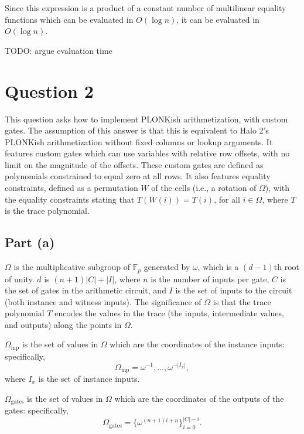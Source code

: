\documentclass[11pt]{article}
\begin{document}
Since this expression is a product of a constant number of multilinear equality functions which can be evaluated in
$O(\log n)$, it can be evaluated in $O(\log n)$.

TODO: argue evaluation time

\section{Question 2}

This question asks how to implement PLONKish arithmetization, with custom gates. The assumption of this
answer is that this is equivalent to Halo 2's PLONKish arithmetization without fixed columns or
lookup arguments. It features custom gates which can use variables with relative row offsets, with
no limit on the magnitude of the offsets. These custom gates are defined as polynomials constrained to equal
zero at all rows. It also features equality constraints, defined as a permutation $W$ of the cells (i.e.,
a rotation of $\Omega$), with the equality constraints stating that $T(W(i)) = T(i)$, for all $i \in \Omega$,
where $T$ is the trace polynomial.

\subsection{Part (a)}

$\Omega$ is the multiplicative subgroup of $\mathbb{F}_p$ generated by $\omega$, which is a $(d-1)$th root of unity.
$d$ is $(n+1)|C| + |I|$, where $n$ is the number of inputs per gate, $C$ is the set of gates in
the arithmetic circuit, and $I$ is the set of inputs
to the circuit (both instance and witness inputs). The significance of $\Omega$ is that the trace polynomial
$T$ encodes the values in the trace (the inputs, intermediate values, and outputs) along the points in $\Omega$.

$\Omega_{\text{inp}}$ is the set of values in $\Omega$ which are the coordinates of the instance inputs: specifically,
\begin{equation}
	\Omega_{\text{inp}} = \omega^{-1}, ..., \omega^{-|I_x|},
\end{equation}
where $I_x$ is the set of instance inputs.

$\Omega_{\text{gates}}$ is the set of values in $\Omega$ which are the coordinates of the outputs of the gates:
specifically,
\begin{equation}
	\Omega_{\text{gates}} = \{\omega^{(n+1)i+n}\}_{i=0}^{|C|-i}.
\end{equation}
\end{document}
